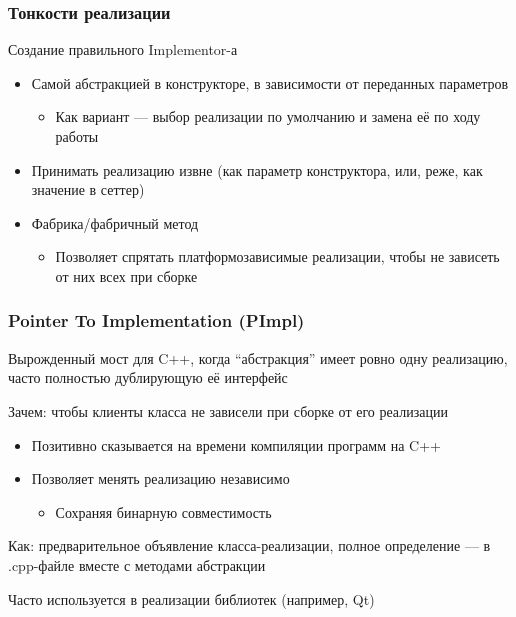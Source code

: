 \documentclass[xetex,mathserif,serif]{beamer}
\begin{document}
	\begin{frame}
		\frametitle{Тонкости реализации}
		Создание правильного Implementor-а
		\begin{itemize}
			\item Самой абстракцией в конструкторе, в зависимости от переданных параметров
			\begin{itemize}
				\item Как вариант --- выбор реализации по умолчанию и замена её по ходу работы
			\end{itemize}
			\item Принимать реализацию извне (как параметр конструктора, или, реже, как значение в сеттер)
			\item Фабрика/фабричный метод
			\begin{itemize}
				\item Позволяет спрятать платформозависимые реализации, чтобы не зависеть от них всех при сборке
			\end{itemize}
		\end{itemize}
	\end{frame}

	\begin{frame}
		\frametitle{Pointer To Implementation (PImpl)}
		Вырожденный мост для C++, когда ``абстракция'' имеет ровно одну реализацию, часто полностью дублирующую её интерфейс

		Зачем: чтобы клиенты класса не зависели при сборке от его реализации

		\begin{itemize}
			\item Позитивно сказывается на времени компиляции программ на C++
			\item Позволяет менять реализацию независимо
			\begin{itemize}
				\item Сохраняя бинарную совместимость
			\end{itemize}
		\end{itemize}

		Как: предварительное объявление класса-реализации, полное определение --- в .cpp-файле вместе с методами абстракции

		Часто используется в реализации библиотек (например, Qt)
	\end{frame}
\end{document}
